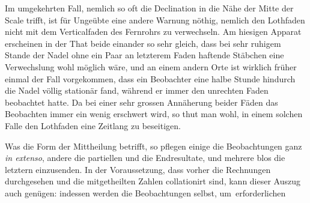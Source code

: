 Im umgekehrten Fall, nemlich so oft die Declination in die Nähe der Mitte der Scale trifft, ist für Ungeübte eine andere Warnung nöthig, nemlich den Lothfaden nicht mit dem Verticalfaden des Fernrohrs zu verwechseln. Am hiesigen Apparat erscheinen in der That beide einander so sehr gleich, dass bei sehr ruhigem Stande der Nadel ohne ein Paar an letzterem Faden haftende Stäbchen eine Verwechslung wohl möglich wäre, und an einem andern Orte ist wirklich früher einmal der Fall vorgekommen, dass ein Beobachter eine halbe Stunde hindurch die Nadel völlig stationär fand, während er immer den unrechten Faden beobachtet hatte. Da bei einer sehr grossen Annäherung beider Fäden das Beobachten immer ein wenig erschwert wird, so thut man wohl, in einem solchen Falle den Lothfaden eine Zeitlang zu beseitigen.

Was die Form der Mittheilung betrifft, so pflegen einige die Beobachtungen ganz \textit{in extenso}, andere die partiellen und die Endresultate, und mehrere blos die letztern einzusenden. In der Voraussetzung, dass vorher die Rechnungen durchgesehen und die mitgetheilten Zahlen collationirt sind, kann dieser Auszug auch genügen: indessen werden die Beobachtungen selbst, um~erforderlichen\par\GaussVSourceGathering{70\textsuperscript{*}}
